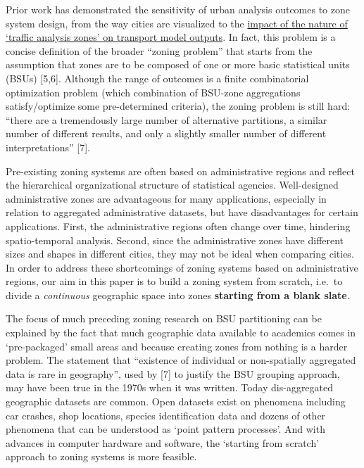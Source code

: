 \documentclass{josis}
\begin{document}
Prior work has demonstrated the sensitivity of urban analysis outcomes to zone system design, from the way cities are visualized to the \href{http://www.iasi.cnr.it/ewgt/13conference/145_binetti.pdf}{impact of the nature of `traffic analysis zones' on transport model outputs}.
In fact, this problem is a concise definition of the broader ``zoning problem'' that starts from the assumption that zones are to be composed of one or more basic statistical units (BSUs) {[}5,6{]}.
Although the range of outcomes is a finite combinatorial optimization problem (which combination of BSU-zone aggregations satisfy/optimize some pre-determined criteria), the zoning problem is still hard: ``there are a tremendously large number of alternative partitions, a similar number of different results, and only a slightly smaller number of different interpretations'' {[}7{]}.

Pre-existing zoning systems are often based on administrative regions and reflect the hierarchical organizational structure of statistical agencies.
Well-designed administrative zones are advantageous for many applications, especially in relation to aggregated administrative datasets, but have disadvantages for certain applications.
First, the administrative regions often change over time, hindering spatio-temporal analysis.
Second, since the administrative zones have different sizes and shapes in different cities, they may not be ideal when comparing cities.
In order to address these shortcomings of zoning systems based on administrative regions, our aim in this paper is to build a zoning system from scratch, i.e.~to divide a \emph{continuous} geographic space into zones \textbf{starting from a blank slate}.

The focus of much preceding zoning research on BSU partitioning can be explained by the fact that much geographic data available to academics comes in `pre-packaged' small areas and because creating zones from nothing is a harder problem.
The statement that ``existence of individual or non-spatially aggregated data is rare in geography'', used by {[}7{]} to justify the BSU grouping approach, may have been true in the 1970s when it was written.
Today dis-aggregated geographic datasets are common.
Open datasets exist on phenomena including car crashes, shop locations, species identification data and dozens of other phenomena that can be understood as `point pattern processes'.
And with advances in computer hardware and software, the `starting from scratch' approach to zoning systems is more feasible.
\end{document}
